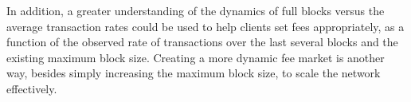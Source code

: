 \documentclass{article}
\begin{document}
In addition, a greater understanding of the dynamics of full blocks versus the average transaction rates could be used to help clients set fees appropriately, as a function of the observed rate of transactions over the last several blocks and the existing maximum block size. Creating a more dynamic fee market is another way, besides simply increasing the maximum block size, to scale the network effectively.

 

\end{document}
